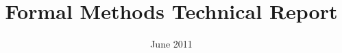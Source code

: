 \documentclass{llncs}
\begin{document}
\mainmatter

%
\pagestyle{plain}
\thispagestyle{plain}


\title{Formal Methods Technical Report}

\date{June 2011}
\maketitle

 
\tableofcontents
\listoffigures
\listoftables
\newpage

 
\end{document}
